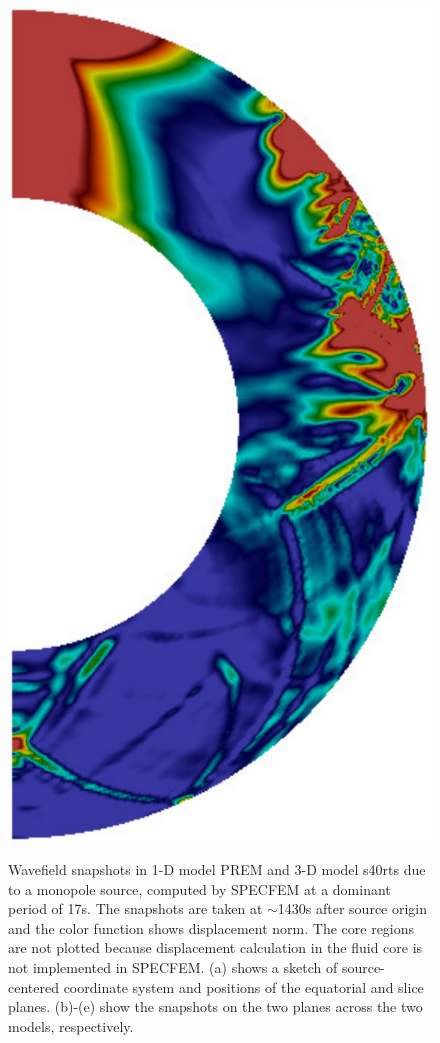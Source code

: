 \documentclass[extra]{gji}
\begin{document}
\begin{figure}
\begin{minipage}{0.6\textwidth}
\begin{minipage}{.585\textwidth}
      \label{fig:3deq}  
    \end{minipage}
    \begin{minipage}{.39\textwidth}
      \centering
      \vspace{1em}
      \includegraphics[height=1.275\textwidth]{fig/snapshot/3d-slice.pdf}
      \label{fig:3dsl}    
    \end{minipage}
  \end{minipage}%
  \caption{Wavefield snapshots in 1-D model 
  PREM and 3-D model s40rts due to a monopole source, 
  computed by SPECFEM at a dominant period of 17s. 
  The snapshots are taken at $\sim$1430s after source origin 
  and the color function shows displacement norm. 
  The core regions are not plotted because displacement calculation
  in the fluid core is not implemented in SPECFEM. 
  (a) shows a sketch of source-centered coordinate system and 
  positions of the equatorial and slice planes. 
  (b)-(e) show the snapshots on the two planes across the two models, respectively.}
  \label{fig:snapshot}
\end{figure}
\end{document}

